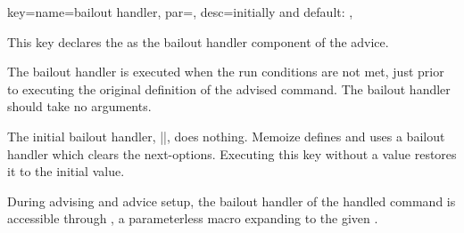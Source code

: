 \documentclass[a4paper,11pt]{article}
\begin{document}
\begin{doc}{%
    key={name=bailout handler, par=,
      desc=initially and default: },
  }
  
  This key declares the  as the bailout handler
  component of the advice.

  The bailout handler is executed when the run conditions are not met, just prior
  to executing the original definition of the advised command.  The bailout
  handler should take no arguments.

  The initial bailout handler, |\relax|, does nothing.  Memoize defines and
  uses a bailout handler which clears the next-options.  Executing this key
  without a value restores it to the initial value.

  During advising and advice setup, the bailout handler of the handled command is
  accessible through , a parameterless macro
  expanding to the given .
\end{doc}
\end{document}

